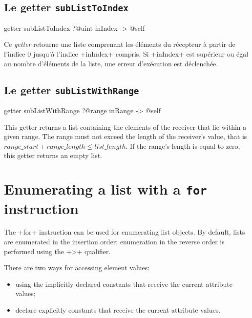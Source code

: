 \subsection{Le getter \texttt{subListToIndex}}

\begin{galgas}
getter subListToIndex ?@uint inIndex -> @self
\end{galgas}

Ce \emph{getter} retourne une liste comprenant les éléments du récepteur à partir de l'indice $0$ jusqu'à l'indice \ggs+inIndex+ compris. Si \ggs+inIndex+ est supérieur ou égal au nombre d'éléments de la liste, une erreur d'exécution est déclenchée.




\subsection{Le getter \texttt{subListWithRange}}

\begin{galgas}
getter subListWithRange
  ?@range inRange
  -> @self
\end{galgas}

This getter returns a list containing the elements of the receiver that lie within a given range. The range must not exceed the length of the receiver's value, that is $range\_start + range\_length \leqslant list\_length$. If the range's length is equal to zero, this getter returns an empty list.





\section{Enumerating a list with a \texttt{for} instruction}

The \ggs+for+ instruction can be used for enumerating list objects. By default, lists are enumerated in the insertion order; enumeration in the reverse order is performed using the \ggs+>+ qualifier.

There are two ways for accessing element values:
\begin{itemize}
\item using the implicitly declared constants that receive the current attribute values;
\item declare explicitly constants that receive the current attribute values.
\end{itemize}

